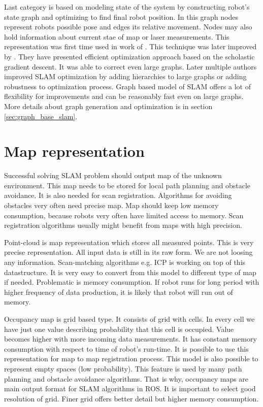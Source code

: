 Last category is based on modeling state of the system by constructing robot's state graph and optimizing to find final robot position. In this graph nodes represent robots possible pose and edges its relative movement. Nodes may also hold information about current stae of map or laser measurements. This representation was first time used in work of \cite{LuMilios}. This technique was later improved by \cite{OlsonGS}. They have presented efficient optimization approach based on the scholastic gradient descent. It was able to correct even large graphs. Later multiple authors improved \gls{SLAM} optimization by adding hierarchies to large graphs or adding robustness to optimization process. Graph based model of SLAM offers a lot of flexibility for improvements and can be reasonably fast even on large graphs. More details about graph generation and optimization is in section \ref{sec:graph_base_slam}.

\section {Map representation}
\label{MAP_REPRE}
Successful solving SLAM problem should output map of the unknown environment. This map needs to be stored for local path planning and obstacle avoidance. It is also needed for scan registration. Algorithms for avoiding obstacles very often need precise map. Map should keep low memory consumption, because robots very often have limited access to memory. Scan registration algorithms usually might benefit from maps with high precision.

Point-cloud is map representation which stores all measured points. This is very precise representation. All input data is still in its raw form. We are not loosing any information. Scan-matching algorithms e.g. \gls{ICP} is working on top of this datastructure. It is very easy to convert from this model to different type of map if needed. Problematic is memory consumption. If robot runs for long period with higher frequency of data production, it is likely that robot will run out of memory.

Occupancy map is grid based type. It consists of grid with cells. In every cell we have just one value describing probability that this cell is occupied. Value becomes higher with more incoming data measurements. It has constant memory consumption with respect to time of robot's run-time. It is possible to use this representation for map to map registration process. This model is also possible to represent empty spaces (low probability). This feature is used by many path planning and obstacle avoidance algorithms. That is why, occupancy maps are main output format for SLAM algorithms in ROS. It is important to select good resolution of grid. Finer grid offers better detail but higher memory consumption.

